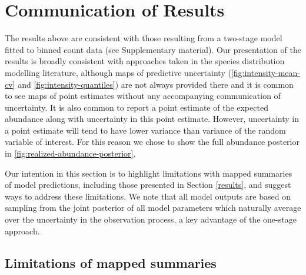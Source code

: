 \documentclass[preprint,12pt]{elsarticle}
\begin{document}

\clearpage %

\section{Communication of Results}

The results above are consistent with those resulting from a two-stage model fitted to binned count data (see Supplementary material).  Our presentation of the results is broadly consistent with approaches taken in the species distribution modelling literature, although maps of predictive uncertainty (\autoref{fig:intensity-mean-cv} and \autoref{fig:intensity-quantiles}) are not always provided there and it is common to see maps of point estimates without any accompanying communication of uncertainty.  It is also common to report a point estimate of the expected abundance along with uncertainty in this point estimate.  However, uncertainty in a point estimate will tend to have lower variance than variance of the random variable of interest.  For this reason we chose to show the full abundance posterior in \autoref{fig:realized-abundance-posterior}.

Our intention in this section is to highlight limitations with mapped summaries of model predictions, including those presented in Section \ref{results}, and suggest ways to address these limitations.  We note that all model outputs are based on sampling from the joint posterior of all model parameters which naturally average over the uncertainty in the observation process, a key advantage of the one-stage approach.   

\subsection{Limitations of mapped summaries}
\end{document}
